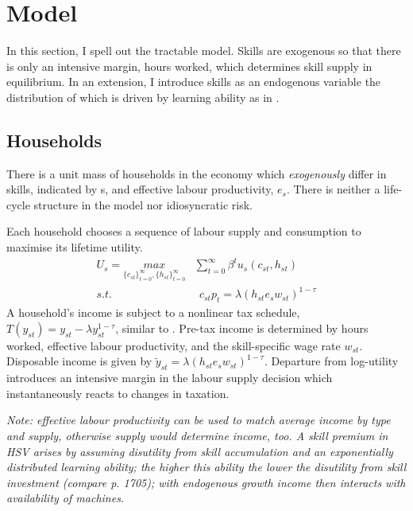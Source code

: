 \section{Model}
In this section, I spell out the tractable model. Skills are exogenous so that there is only an intensive margin, hours worked, which determines skill supply in equilibrium. In an extension, I introduce  skills as an endogenous variable the distribution of which is driven by learning ability as in \cite{Heathcote2017OptimalFramework}. 

\subsection{Households}
There is a unit mass of households in the economy which \textit{exogenously} differ in skills, indicated by s, and effective labour productivity, $e_{s}$. There is neither a life-cycle structure in the model nor idiosyncratic risk.

Each household chooses a sequence of labour supply and consumption to maximise its lifetime utility. 
\begin{align}
U_{s}=\underset{\{c_{st}\}_{t=0}^{\infty}, \{h_{st}\}_{t=0}^{\infty}}{max}&\sum_{t=0}^{\infty}\beta^t u_s(c_{st}, h_{st})\\
s.t.& \ \ c_{st}p_{t}=\lambda \left(h_{st}e_{s}w_{st}\right)^{1-\tau}
\end{align}
A household's income is subject to a nonlinear tax schedule, $T(y_{st})=y_{st}-\lambda y_{st}^{1-\tau}$, similar to \cite{Heathcote2017OptimalFramework}. Pre-tax income is determined by hours worked, effective labour productivity, and the skill-specific wage rate $w_{st}$. Disposable income is given by $\tilde{y}_{st}=\lambda \left(h_{st}e_{s}w_{st}\right)^{1-\tau}$.
Departure from log-utility introduces an intensive margin in the labour supply decision which instantaneously reacts to changes in taxation. 

\textit{Note: effective labour productivity can be used to match average income by type and supply, otherwise supply would determine income, too. A skill premium in HSV arises by assuming disutility from skill accumulation and an exponentially distributed learning ability; the higher this ability the lower the disutility from skill investment (compare p. 1705); with endogenous growth income then interacts with availability of machines. }

